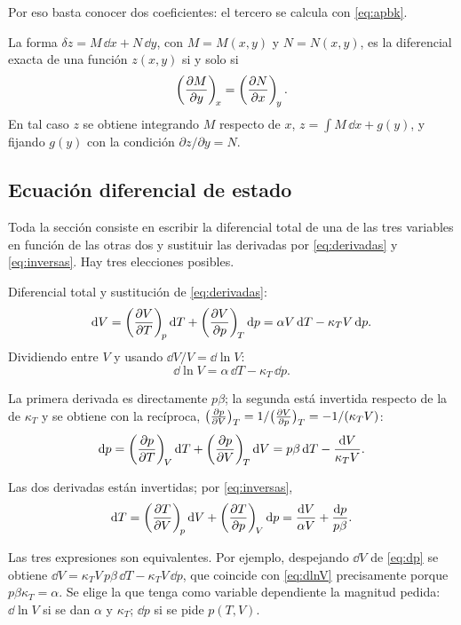 Por eso basta conocer dos coeficientes: el tercero se calcula con \eqref{eq:apbk}.

\begin{teorema}\label{teo:exactitud}
La forma $\delta z=M\,\dd x+N\,\dd y$, con $M=M(x,y)$ y $N=N(x,y)$, es la diferencial exacta de una
función $z(x,y)$ si y solo si
\begin{equation}\label{eq:exacta}
  \left(\frac{\partial M}{\partial y}\right)_{\!x}=\left(\frac{\partial N}{\partial x}\right)_{\!y}.
\end{equation}
En tal caso $z$ se obtiene integrando $M$ respecto de $x$, $z=\int M\,\dd x+g(y)$, y fijando $g(y)$ con
la condición $\partial z/\partial y=N$.
\end{teorema}

\subsection{Ecuación diferencial de estado}

Toda la sección consiste en escribir la diferencial total de una de las tres variables en función de
las otras dos y sustituir las derivadas por \eqref{eq:derivadas} y \eqref{eq:inversas}. Hay tres
elecciones posibles.

 Diferencial total y sustitución de \eqref{eq:derivadas}:
\[
  \mathrm{d} V=\left(\frac{\partial V}{\partial T}\right)_{\!p}\mathrm{d} T+\left(\frac{\partial V}{\partial p}\right)_{\!T}\mathrm{d} p=\alpha V\,\mathrm{d} T-\kappa_TV\,\mathrm{d} p.
\]
Dividiendo entre $V$ y usando $\dd V/V=\dd\ln V$:
\begin{equation}\label{eq:dlnV}
  \dd\ln V=\alpha\,\dd T-\kappa_T\,\dd p.
\end{equation}

 La primera derivada es directamente $p\beta$; la
segunda está invertida respecto de la de $\kappa_T$ y se obtiene con la recíproca,
$\bigl(\tfrac{\partial p}{\partial V}\bigr)_{T}=1/\bigl(\tfrac{\partial V}{\partial p}\bigr)_{T}=-1/(\kappa_TV)$:
\begin{equation}\label{eq:dp}
  \mathrm{d} p=\left(\frac{\partial p}{\partial T}\right)_{\!V}\mathrm{d} T+\left(\frac{\partial p}{\partial V}\right)_{\!T}\mathrm{d} V=p\beta\,\mathrm{d} T-\frac{\mathrm{d} V}{\kappa_TV}.
\end{equation}

 Las dos derivadas están invertidas; por \eqref{eq:inversas},
\begin{equation}\label{eq:dT}
  \mathrm{d} T=\left(\frac{\partial T}{\partial V}\right)_{\!p}\mathrm{d} V+\left(\frac{\partial T}{\partial p}\right)_{\!V}\mathrm{d} p=\frac{\mathrm{d} V}{\alpha V}+\frac{\mathrm{d} p}{p\beta}.
\end{equation}

\begin{observacion}
Las tres expresiones son equivalentes. Por ejemplo, despejando $\dd V$ de \eqref{eq:dp} se obtiene
$\dd V=\kappa_TV\,p\beta\,\dd T-\kappa_TV\,\dd p$, que coincide con \eqref{eq:dlnV} precisamente porque
$p\beta\kappa_T=\alpha$. Se elige la que tenga como variable dependiente la magnitud pedida: $\dd\ln V$
si se dan $\alpha$ y $\kappa_T$; $\dd p$ si se pide $p(T,V)$.
\end{observacion}

